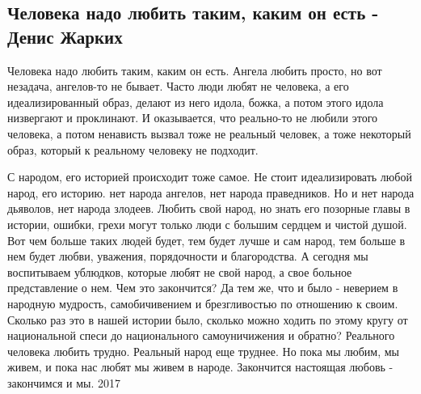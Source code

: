  
 
 

\subsection{Человека надо любить таким, каким он есть - Денис Жарких}


Человека надо любить таким, каким он есть. Ангела любить просто, но вот
незадача, ангелов-то не бывает. Часто люди любят не человека, а его
идеализированный образ, делают из него идола, божка, а потом этого идола
низвергают и проклинают. И оказывается, что реально-то не любили этого
человека, а потом ненависть вызвал тоже не реальный человек, а тоже некоторый
образ, который к реальному человеку не подходит.

С народом, его историей происходит тоже самое. Не стоит идеализировать любой
народ, его историю. нет народа ангелов, нет народа праведников. Но и нет народа
дьяволов, нет народа злодеев. Любить свой народ, но знать его позорные главы в
истории, ошибки, грехи могут только люди с большим сердцем и чистой душой. Вот
чем больше таких людей будет, тем будет лучше и сам народ, тем больше в нем
будет любви, уважения, порядочности и благородства. А сегодня мы воспитываем
ублюдков, которые любят не свой народ, а свое больное представление о нем. Чем
это закончится? Да тем же, что и было - неверием в народную мудрость,
самобичивением и брезгливостью по отношению к своим. Сколько раз это в нашей
истории было, сколько можно ходить по этому кругу от национальной спеси до
национального самоуничижения и обратно? Реального человека любить трудно.
Реальный народ еще труднее. Но пока мы любим, мы живем, и пока нас любят мы
живем в народе. Закончится настоящая любовь - закончимся и мы.  2017
